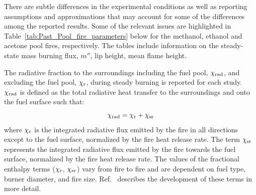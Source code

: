 \documentclass[12pt]{article}
\begin{document}
There are subtle differences in the experimental conditions as well as reporting assumptions and approximations that may account for some of the differences among the reported results. Some of the relevant issues are highlighted in Table~\ref{tab:Past_Pool_fire_parameters} below for the methanol, ethanol and acetone pool fires, respectively. The tables include information on the steady-state mass burning flux, $m''$, lip height, mean flame height. 

The radiative fraction to the surroundings including the fuel pool, $\chi_{\rm {rad}}$, and excluding the fuel pool, $\chi_{\rm{r}}$, during steady burning is reported for each study. $\chi_{\rm{rad}}$ is defined as the total radiative heat transfer to the surroundings and onto the fuel surface such that:
\begin{equation}
\label{eq:chi_rad}
\chi_{\rm{rad}}=\chi_{\rm{r}}+\chi_{\rm{sr}}
\end{equation}
where $\chi_{\rm{r}}$ is the integrated radiative flux emitted by the fire in all directions except to the fuel surface, normalized by the fire heat release rate. The term $\chi_{\rm{sr}}$ represents the integrated radiative flux emitted by the fire towards the fuel surface, normalized by the fire heat release rate. The values of the fractional enthalpy terms ($\chi_{\rm{r}}$, $\chi_{\rm{sr}}$) vary from fire to fire and are dependent on fuel type, burner diameter, and fire size. Ref.~\cite{Kim2019} describes the development of these terms in more detail.
\end{document}
